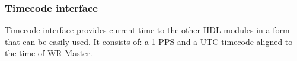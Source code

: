 \subsubsection{Timecode interface}
\label{sec:wrpc_timecode}


Timecode interface provides current time to the other HDL modules in a form that
can be easily used. It consists of: a 1-PPS and a UTC timecode
aligned to the time of WR Master.

